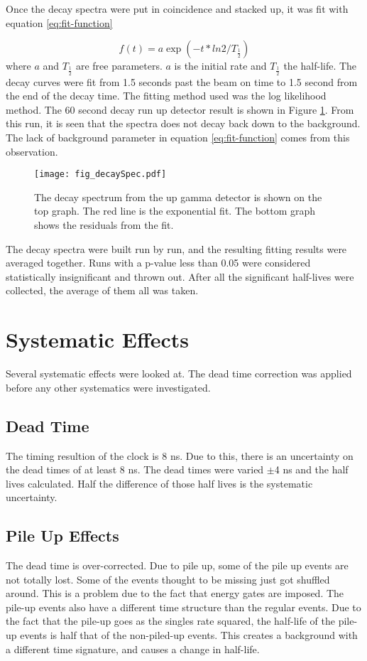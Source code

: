 \documentclass[main.tex]{subfiles}
\begin{document}
Once the decay spectra were put in coincidence and stacked up, it was fit with equation \ref{eq:fit-function}

%
\begin{equation}
	f(t) = a\exp{(-t*ln2/T_{\frac{1}{2}})}
	\label{eq:fit-function}
\end{equation}
%
where $a$ and $T_{\frac{1}{2}}$ are free parameters.
$a$ is the initial rate and $T_{\frac{1}{2}}$ the half-life.
The decay curves were fit from 1.5 seconds past the beam on time to 1.5 second from the end of the decay time. 
The fitting method used was the log likelihood method. 
The 60 second decay run up detector result is shown in Figure \ref{fig:60secdecay}.
From this run, it is seen that the spectra does not decay back down to the background. 
The lack of background parameter in equation \ref{eq:fit-function} comes from this observation. 

\begin{figure}[!htb]
\centerline{\texttt{[image: fig\_decaySpec.pdf]}}
\caption{The decay spectrum from the up gamma detector is shown on the top graph.
	The red line is the exponential fit. 
	The bottom graph shows the residuals from the fit. 
	}
\label{fig:60secdecay}
\end{figure}


The decay spectra were built run by run, and the resulting fitting results were averaged together. 
Runs with a p-value less than 0.05 were considered statistically insignificant and thrown out.
After all the significant half-lives were collected, the average of them all was taken.

\section{Systematic Effects}
Several systematic effects were looked at.
The dead time correction was applied before any other systematics were investigated. 

\subsection{Dead Time}
The timing resultion of the clock is 8 ns.
Due to this, there is an uncertainty on the dead times of at least 8 ns.
The dead times were varied $\pm$4 ns and the half lives calculated.
Half the difference of those half lives is the systematic uncertainty.

\subsection{Pile Up Effects}
The dead time is over-corrected. 
Due to pile up, some of the pile up events are not totally lost.
Some of the events thought to be missing just got shuffled around.
This is a problem due to the fact that energy gates are imposed.
The pile-up events also have a different time structure than the regular events.
Due to the fact that the pile-up goes as the singles rate squared, the half-life of the pile-up events is half that of the non-piled-up events.
This creates a background with a different time signature, and causes a change in half-life.
\end{document}
